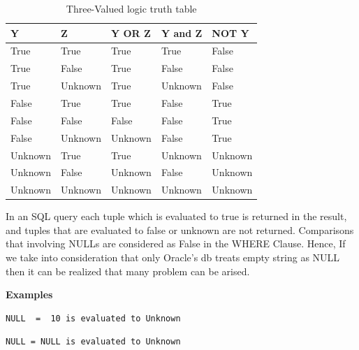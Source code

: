 \begin{table}[h]
\centering
\caption{Three-Valued logic truth table}
\label{my-label}
\begin{tabular}{|l|l|l|l|l| }
\hline
\textbf{Y} & \textbf{Z} & \textbf{Y OR Z} & \textbf{Y and Z} & \textbf{NOT Y} \\ \hline
True       & True       & True            & True             & False          \\ \hline
True       & False      & True            & False            & False          \\ \hline
True       & Unknown    & True            & Unknown          & False          \\ \hline
False      & True       & True            & False            & True           \\ \hline
False      & False      & False           & False            & True           \\ \hline
False      & Unknown    & Unknown         & False            & True           \\ \hline
Unknown    & True       & True            & Unknown          & Unknown        \\ \hline
Unknown    & False      & Unknown         & False            & Unknown        \\ \hline
Unknown    & Unknown    & Unknown         & Unknown          & Unknown        \\ \hline
\end{tabular}
\end{table}
 
In an SQL query each tuple which is evaluated to true is returned in the result, and tuples that are evaluated to false or unknown are not returned. Comparisons that involving NULLs are considered as False in the WHERE Clause. Hence, If we take into consideration that only Oracle’s db treats empty string as NULL then it can be realized that many problem can be arised. 

\hfill\newline
\textbf{Examples}
\begin{mdframed}[nobreak=true, backgroundcolor=lightgray!20] 
\begin{lstlisting}[style=SQL]
NULL  =  10 is evaluated to Unknown 
\end{lstlisting}
\end{mdframed}

\begin{mdframed}[nobreak=true, backgroundcolor=lightgray!20] 
\begin{lstlisting}[style=SQL]
NULL = NULL is evaluated to Unknown  
\end{lstlisting}
\end{mdframed}

